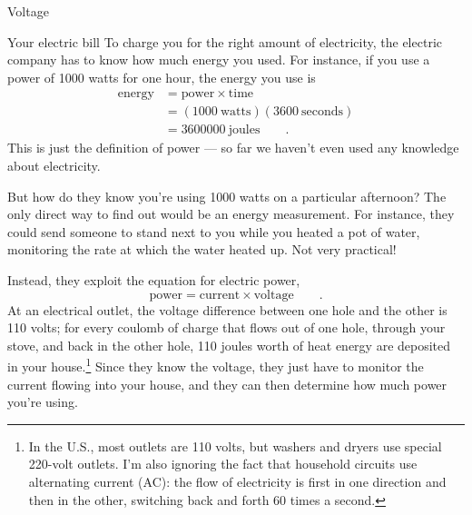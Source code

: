 \begin{envsubsection}{Voltage}
\begin{eg}{Your electric bill}
To charge you for the right amount of electricity, the electric company has
to know how much energy you used. For instance, if you use a power of 1000 watts
for one hour, the energy you use is
\begin{align*}
	\text{energy} &= \text{power} \times \text{time} \\
		      &= (1000\ \text{watts})(3600\ \text{seconds})\\
		      & = 3600000\ \text{joules} \qquad .
\end{align*}
This is just the definition of power --- so far we haven't even used any
knowledge about electricity.

But how do they know you're using 1000 watts on a particular afternoon?
The only direct way to find out would be an energy measurement. For instance,
they could send someone to stand next to you while you heated a pot of
water, monitoring the rate at which the water heated up. Not very practical!

Instead, they exploit the equation for electric power,
\begin{equation*}
	\text{power} = \text{current} \times \text{voltage} \qquad .
\end{equation*}
At an electrical outlet, the voltage difference between one hole and
the other is 110 volts; for every coulomb of charge that flows out of one hole,
through your stove, and back in the other hole, 110 joules worth of heat energy
are deposited in your house.\footnote{In the U.S., most outlets are 110 volts, but
washers and dryers use special 220-volt outlets. I'm also ignoring the fact that
household circuits use alternating current (AC): the flow of electricity is first
in one direction and then in the other, switching back and forth 60 times a second.}
Since they know the voltage, they just have to
monitor the current flowing into your house, and they can then determine
how much power you're using.
\end{eg}
\end{envsubsection}
%
